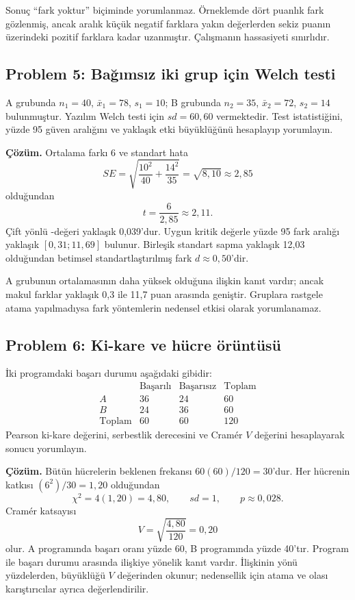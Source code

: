 Sonuç ``fark yoktur'' biçiminde yorumlanmaz. Örneklemde dört puanlık fark
gözlenmiş, ancak aralık küçük negatif farklara yakın değerlerden sekiz puanın
üzerindeki pozitif farklara kadar uzanmıştır. Çalışmanın hassasiyeti sınırlıdır.

\subsection*{Problem 5: Bağımsız iki grup için Welch testi}

A grubunda $n_1=40$, $\bar x_1=78$, $s_1=10$; B grubunda
$n_2=35$, $\bar x_2=72$, $s_2=14$ bulunmuştur. Yazılım Welch testi için
$sd=60{,}60$ vermektedir. Test istatistiğini, yüzde 95 güven aralığını ve
yaklaşık etki büyüklüğünü hesaplayıp yorumlayın.

\textbf{Çözüm.} Ortalama farkı 6 ve standart hata
\[
SE=\sqrt{\frac{10^2}{40}+\frac{14^2}{35}}
=\sqrt{8{,}10}\approx2{,}85
\]
olduğundan
\[
t=\frac{6}{2{,}85}\approx2{,}11.
\]
Çift yönlü \pval-değeri yaklaşık 0,039'dur. Uygun kritik değerle yüzde 95 fark
aralığı yaklaşık $[0{,}31;11{,}69]$ bulunur. Birleşik standart sapma yaklaşık
12,03 olduğundan betimsel standartlaştırılmış fark $d\approx0{,}50$'dir.

A grubunun ortalamasının daha yüksek olduğuna ilişkin kanıt vardır; ancak
makul farklar yaklaşık 0,3 ile 11,7 puan arasında geniştir. Gruplara rastgele
atama yapılmadıysa fark yöntemlerin nedensel etkisi olarak yorumlanamaz.

\subsection*{Problem 6: Ki-kare ve hücre örüntüsü}

İki programdaki başarı durumu aşağıdaki gibidir:
\[
\begin{array}{c|rr|r}
 & \text{Başarılı} & \text{Başarısız} & \text{Toplam}\\ \hline
A&36&24&60\\
B&24&36&60\\ \hline
\text{Toplam}&60&60&120
\end{array}
\]
Pearson ki-kare değerini, serbestlik derecesini ve Cramér $V$ değerini
hesaplayarak sonucu yorumlayın.

\textbf{Çözüm.} Bütün hücrelerin beklenen frekansı $60(60)/120=30$'dur.
Her hücrenin katkısı $(6^2)/30=1{,}20$ olduğundan
\[
\chi^2=4(1{,}20)=4{,}80,
\qquad sd=1,
\qquad p\approx0{,}028.
\]
Cramér katsayısı
\[
V=\sqrt{\frac{4{,}80}{120}}=0{,}20
\]
olur. A programında başarı oranı yüzde 60, B programında yüzde 40'tır.
Program ile başarı durumu arasında ilişkiye yönelik kanıt vardır. İlişkinin
yönü yüzdelerden, büyüklüğü $V$ değerinden okunur; nedensellik için atama ve
olası karıştırıcılar ayrıca değerlendirilir.

